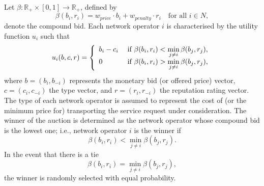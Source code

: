 Let $\beta : \mathbb{R}_+\times [0,1] \to \mathbb{R}_+$, defined by
\begin{equation}
	\label{eq:def_beta_direct}
	\beta(b_i, r_i) = w_{price}\cdot b_i + w_{penalty}\cdot r_i \quad\text{for all } i\in N,
\end{equation}
denote the compound bid. Each network operator $i$ is characterised by the utility function $u_i$ such that
\begin{equation}
	\label{eq:sellers_utility_direct}
	u_i(b,c,r) = \left\{
	\begin{array}{l l}
		b_i-c_i & \;\text{if } \beta(b_i, r_i) < \displaystyle\min_{j\neq i}\beta(b_j,r_j),\\
		0 & \;\text{if } \beta(b_i, r_i) > \displaystyle\min_{j\neq i}\beta(b_j,r_j),
	\end{array}\right.
\end{equation}
where $b = (b_i,b_{-i})$ represents the monetary bid (or offered price) vector, $c = (c_i, c_{-i})$ the type vector, and $r = (r_i, r_{-i})$ the reputation rating vector. The type of each network operator is assumed to represent the cost of (or the minimum price for) transporting the service request under consideration. The winner of the auction is determined as the network operator whose compound bid is the lowest one; i.e., network operator $i$ is the winner if
\begin{equation}
	\beta(b_i, r_i) < \displaystyle\min_{j\neq i}\beta(b_j,r_j).
\end{equation}
In the event that there is a tie
\begin{equation}
	\beta(b_i, r_i) = \displaystyle\min_{j\neq i}\beta(b_j,r_j),
\end{equation}
the winner is randomly selected with equal probability.

